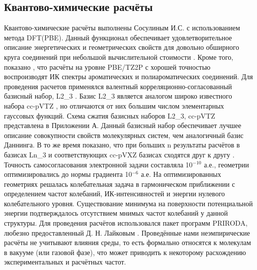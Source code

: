 \subsection{Квантово-химические расчёты}
Квантово-химические расчёты выполнены Сосулиным И.С. с использованием метода DFT(PBE). Данный функционал обеспечивает удовлетворительное описание энергетических и геометрических свойств для довольно обширного круга соединений при небольшой вычислительной стоимости \cite{Ernzerhof1999}. Кроме того, показано \cite{Furera2006, POPOV}, что расчёты на уровне PBE/TZ2P с хорошей точностью воспроизводят ИК спектры ароматических и полиароматических соединений. Для проведения расчетов применялся валентный корреляционно-согласованный базисный набор, L2\_3 
\cite{Laikov2005}. 
Базис L2\_3 является аналогом широко известного набора cc-pVTZ 
\cite{Kendall1992}, но отличаются от них большим числом элементарных гауссовых функций. Схема сжатия базисных наборов L2\_3, cc-pVTZ представлена в Приложении А. Данный базисный набор обеспечивает лучшее описание совокупности свойств молекулярных систем, чем аналогичный базис Даннинга. В то же время показано, что при больших n результаты расчётов в базисах Ln\_3 и соответствующих cc-pVXZ базисах сходятся друг к другу \cite{Laikov2005}. Точность самосогласования электронной задачи составляла 10$^{-10}$ а.е., геометрии оптимизировались до нормы градиента 10$^{-6}$ а.е. На оптимизированных геометриях решалась колебательная задача в гармоническом приближении с определением частот колебаний, ИК-интенсивностей и энергии нулевого колебательного уровня. Существование минимума на поверхности потенциальной энергии подтверждалось отсутствием мнимых частот колебаний у данной структуры. Для проведения расчётов использовался пакет программ PRIRODA, любезно предоставленный Д. Н. Лайковым \cite{Laikov}. Проведённые нами неэмпирические расчёты не учитывают влияния среды, то есть формально относятся к молекулам в вакууме (или газовой фазе), что может приводить к некоторому  расхождению экспериментальных и расчётных частот.











